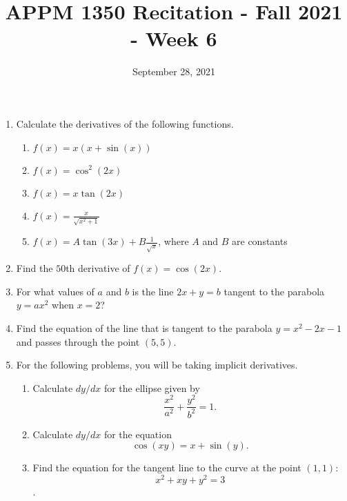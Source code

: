\documentclass{article}
\title{APPM 1350 Recitation - Fall 2021 - Week 6}
\date{September 28, 2021}
\begin{document}
	
\maketitle

\begin{enumerate}
	\item Calculate the derivatives of the following functions.
	\begin{enumerate}
		\item $f(x) = x(x+\sin(x))$
		\item $f(x) = \cos^2(2x)$
		\item $f(x) = x\tan(2x)$
		\item $f(x) = \frac{x}{\sqrt{x^2+1}}$
		\item $f \left( x \right) = A \tan \left( 3x \right) + B \frac{1}{\sqrt{x}}$, where $A$ and $B$ are constants
	\end{enumerate}
	\item Find the $50$th derivative of $f(x) = \cos(2x)$.
	\item For what values of $a$ and $b$ is the line $2x+y=b$ tangent to the parabola $y = ax^2$ when $x=2$?
	\item Find the equation of the line that is tangent to the parabola $y = x^{2} - 2x - 1$ and passes through the point $\left( 5, 5 \right)$.
	\item For the following problems, you will be taking implicit derivatives.
	\begin{enumerate}
		\item Calculate $dy/dx$ for the ellipse given by
		$$\frac{x^2}{a^2}+\frac{y^2}{b^2} = 1.$$
		\item Calculate $dy/dx$ for the equation
		$$\cos(xy) = x+\sin(y).$$
		\item Find the equation for the tangent line to the curve at the point $\left( 1, 1 \right)$:
		$$x^2+xy+y^2 = 3$$.
	\end{enumerate}
\end{enumerate}
\end{document}
